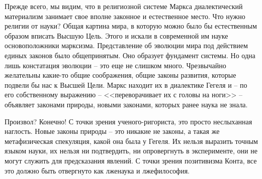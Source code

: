 \documentclass{book}
\begin{document}
Прежде всего, мы видим, что в религиозной системе Маркса диалектический материализм занимает свое вполне законное и естественное место. Что нужно религии от науки? Общая картина мира, в которую можно было бы естественным образом вписать Высшую Цель. Этого и искали в современной им науке основоположники марксизма. Представление об эволюции мира под действием единых законов было общепринятым. Оно образует фундамент системы. Но одна лишь констатация эволюции -- это еще не слишком много. Чрезвычайно желательны какие-то общие соображения, общие законы развития, которые подвели бы нас к Высшей Цели. Маркс находит их в диалектике Гегеля и -- по его собственному выражению -- <<переворачи­вает их с головы на ноги>> --объявляет законами природы, новыми законами, которых ранее наука не знала.

Произвол? Конечно! С точки зрения ученого-ригориста, это просто неслыханная наглость. Новые законы природы -- это никакие не законы, а такая же метафизическая спекуляция, какой она была у Гегеля. Их нельзя выразить точным языком науки, их нельзя ни подтвердить, ни опровергнуть в эксперименте, они не могут служить для предсказания явлений. С точки зрения позитивизма Конта, все это должно быть отвергнуто как лженаука и лжефилософия.
\end{document}
